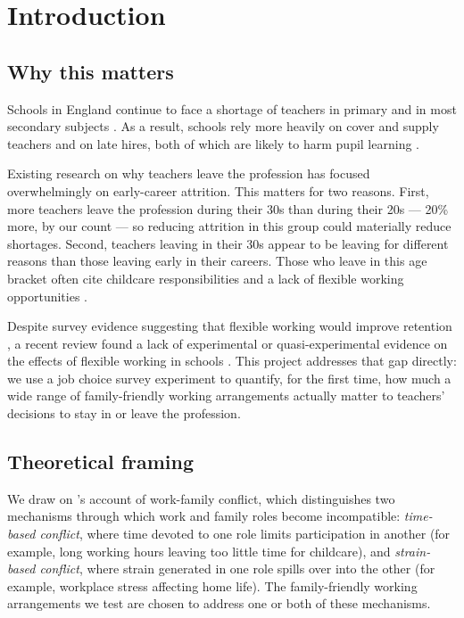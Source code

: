 \chapter{Introduction}

\section{Why this matters}

Schools in England continue to face a shortage of teachers in primary and in most secondary
subjects \citep{mclean2025teacher}. As a result, schools rely more heavily on cover and supply
teachers and on late hires, both of which are likely to harm pupil learning
\citep{benhenda2022absence,papay2016productivity}.

Existing research on why teachers leave the profession has focused overwhelmingly on
early-career attrition. This matters for two reasons. First, more teachers leave the profession
during their 30s than during their 20s --- 20\% more, by our count --- so reducing attrition in
this group could materially reduce shortages. Second, teachers leaving in their 30s appear to be
leaving for different reasons than those leaving early in their careers. Those who leave in this
age bracket often cite childcare responsibilities \citep{kersaint2007why} and a lack of flexible
working opportunities \citep{dfe2024working}.

Despite survey evidence suggesting that flexible working would improve retention
\citep{dfe2024working}, a recent review found a lack of experimental or quasi-experimental
evidence on the effects of flexible working in schools \citep{harland2023review}. This project
addresses that gap directly: we use a job choice survey experiment to quantify, for the first
time, how much a wide range of family-friendly working arrangements actually matter to teachers'
decisions to stay in or leave the profession.

\section{Theoretical framing}

We draw on \citet{greenhaus1985sources}'s account of work-family conflict, which distinguishes
two mechanisms through which work and family roles become incompatible: \emph{time-based
conflict}, where time devoted to one role limits participation in another (for example, long
working hours leaving too little time for childcare), and \emph{strain-based conflict}, where
strain generated in one role spills over into the other (for example, workplace stress affecting
home life). The family-friendly working arrangements we test are chosen to address one or both
of these mechanisms.

